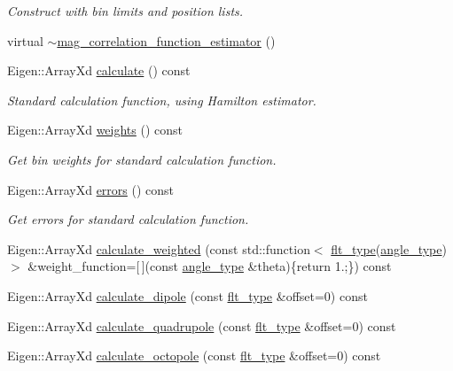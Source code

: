\begin{DoxyCompactItemize}
\begin{DoxyCompactList}\small\item\em Construct with bin limits and position lists. \end{DoxyCompactList}\item 
virtual \hyperlink{classIceBRG_1_1mag__correlation__function__estimator_a8d3457d60040f2a4b8114bd960578602}{$\sim$mag\-\_\-correlation\-\_\-function\-\_\-estimator} ()
\item 
Eigen\-::\-Array\-Xd \hyperlink{classIceBRG_1_1mag__correlation__function__estimator_a0cad08d37e08c2ef1397e87609647f30}{calculate} () const 
\begin{DoxyCompactList}\small\item\em Standard calculation function, using Hamilton estimator. \end{DoxyCompactList}\item 
Eigen\-::\-Array\-Xd \hyperlink{classIceBRG_1_1mag__correlation__function__estimator_a75f844fbabc0b370ef6eafac119ac487}{weights} () const 
\begin{DoxyCompactList}\small\item\em Get bin weights for standard calculation function. \end{DoxyCompactList}\item 
Eigen\-::\-Array\-Xd \hyperlink{classIceBRG_1_1mag__correlation__function__estimator_a5255e1f640ca3ec3eed500290b48551e}{errors} () const 
\begin{DoxyCompactList}\small\item\em Get errors for standard calculation function. \end{DoxyCompactList}\item 
Eigen\-::\-Array\-Xd \hyperlink{classIceBRG_1_1mag__correlation__function__estimator_af2088b0c2fe2d5c6c33d25419fd0fab3}{calculate\-\_\-weighted} (const std\-::function$<$ \hyperlink{lib_2IceBRG__main_2common_8h_ad0f130a56eeb944d9ef2692ee881ecc4}{flt\-\_\-type}(\hyperlink{namespaceIceBRG_a688eeb0811a2474b20b667ed2e9625a1}{angle\-\_\-type})$>$ \&weight\-\_\-function=\mbox{[}$\,$\mbox{]}(const \hyperlink{namespaceIceBRG_a688eeb0811a2474b20b667ed2e9625a1}{angle\-\_\-type} \&theta)\{return 1.;\}) const 
\item 
Eigen\-::\-Array\-Xd \hyperlink{classIceBRG_1_1mag__correlation__function__estimator_a4c851a8f4cee148e4334c810c5e418be}{calculate\-\_\-dipole} (const \hyperlink{lib_2IceBRG__main_2common_8h_ad0f130a56eeb944d9ef2692ee881ecc4}{flt\-\_\-type} \&offset=0) const 
\item 
Eigen\-::\-Array\-Xd \hyperlink{classIceBRG_1_1mag__correlation__function__estimator_aaffcdd4f844aa6f5ec507a413d7cdf0c}{calculate\-\_\-quadrupole} (const \hyperlink{lib_2IceBRG__main_2common_8h_ad0f130a56eeb944d9ef2692ee881ecc4}{flt\-\_\-type} \&offset=0) const 
\item 
Eigen\-::\-Array\-Xd \hyperlink{classIceBRG_1_1mag__correlation__function__estimator_a3ccc3e13d9e80433a0f5a476f57aa5b4}{calculate\-\_\-octopole} (const \hyperlink{lib_2IceBRG__main_2common_8h_ad0f130a56eeb944d9ef2692ee881ecc4}{flt\-\_\-type} \&offset=0) const 
\end{DoxyCompactItemize}


